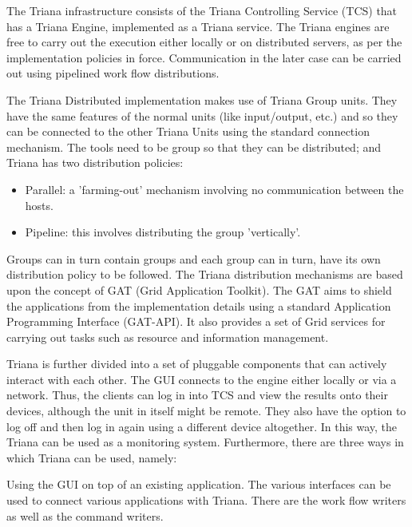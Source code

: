 \documentclass[9pt,twocolumn,twoside]{styles/osajnl}
\begin{document}
\cite{TrianaDocumentation2} The Triana infrastructure consists of the
Triana Controlling Service (TCS) that has a Triana Engine, implemented
as a Triana service.  The Triana engines are free to carry out the
execution either locally or on distributed servers, as per the
implementation policies in force.  Communication in the later case can
be carried out using pipelined work flow distributions.

The Triana Distributed implementation makes use of Triana Group units.
They have the same features of the normal units (like input/output,
etc.) and so they can be connected to the other Triana Units using the
standard connection mechanism.  The tools need to be group so that
they can be distributed; and Triana has two distribution policies:

\begin{itemize}

\item Parallel: a 'farming-out' mechanism involving no communication between the hosts.
\item Pipeline: this involves distributing the group 'vertically'.

\end{itemize}

Groups can in turn contain groups and each group can in turn, have its
own distribution policy to be followed.  The Triana distribution
mechanisms are based upon the concept of GAT (Grid Application
Toolkit).  The GAT aims to shield the applications from the
implementation details using a standard Application Programming
Interface (GAT-API).  It also provides a set of Grid services for
carrying out tasks such as resource and information management.

Triana is further divided into a set of pluggable components that can 
actively interact with each other. The GUI connects to the engine either 
locally or via a network. Thus, the clients can log in into TCS and view 
the results onto their devices, although the unit in itself might be 
remote. They also have the option to log off and then log in again using 
a different device altogether. In this way, the Triana can be used as a 
monitoring system. Furthermore, there are three ways in which Triana can 
be used, namely: 


\item Using the GUI on top of an existing application. The various 
interfaces can be used to connect various applications with Triana. 
There are the work flow writers as well as the command writers. 
\end{document}
